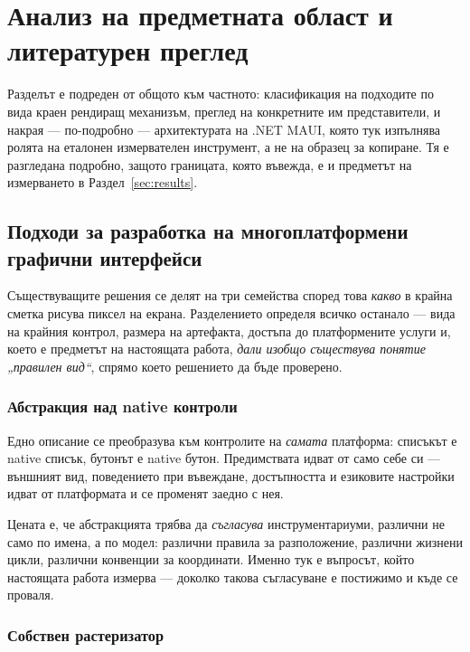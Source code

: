 \section{Анализ на предметната област и литературен преглед}
\label{sec:literature}

Разделът е подреден от общото към частното: класификация на подходите по вида краен
рендиращ механизъм, преглед на конкретните им представители, и накрая --- по-подробно ---
архитектурата на .NET MAUI, която тук изпълнява ролята на еталонен измервателен
инструмент, а не на образец за копиране. Тя е разгледана подробно, защото границата,
която въвежда, е и предметът на измерването в Раздел~\ref{sec:results}.

\subsection{Подходи за разработка на многоплатформени графични интерфейси}
\label{subsec:approaches}

Съществуващите решения се делят на три семейства според това \emph{какво} в крайна
сметка рисува пиксел на екрана. Разделението определя всичко останало --- вида на
крайния контрол, размера на артефакта, достъпа до платформените услуги и, което е
предметът на настоящата работа, \emph{дали изобщо съществува понятие „правилен вид“},
спрямо което решението да бъде проверено.

\subsubsection{Абстракция над native контроли}

Едно описание се преобразува към контролите на \emph{самата} платформа: списъкът е
native списък, бутонът е native бутон. Предимствата идват от само себе си --- външният
вид, поведението при въвеждане, достъпността и езиковите настройки идват от платформата
и се променят заедно с нея.

Цената е, че абстракцията трябва да \emph{съгласува} инструментариуми, различни не само по
имена, а по модел: различни правила за разположение, различни жизнени цикли, различни
конвенции за координати. Именно тук е въпросът, който настоящата работа измерва --- доколко
такова съгласуване е постижимо и къде се проваля.

\subsubsection{Собствен растеризатор}

